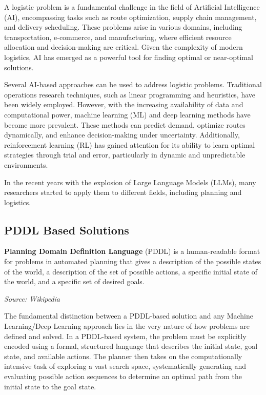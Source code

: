 A logistic problem is a fundamental challenge in the field of Artificial
Intelligence (AI), encompassing tasks such as route optimization, supply chain
management, and delivery scheduling. These problems arise in various domains, including
transportation, e-commerce, and manufacturing, where efficient resource
allocation and decision-making are critical. Given the complexity of modern logistics,
AI has emerged as a powerful tool for finding optimal or near-optimal solutions.

Several AI-based approaches can be used to address logistic problems. Traditional
operations research techniques, such as linear programming and heuristics, have been
widely employed. However, with the increasing availability of data and computational
power, machine learning (ML) and deep learning methods have become more
prevalent. These methods can predict demand, optimize routes dynamically, and enhance
decision-making under uncertainty. Additionally, reinforcement learning (RL) has
gained attention for its ability to learn optimal strategies through trial and error,
particularly in dynamic and unpredictable environments.

In the recent years with the explosion of Large Language Models (LLMs), many researchers
started to apply them to different fields, including planning and logistics.


\subsection{PDDL Based Solutions}
\begin{blockquote}
  \textbf{Planning Domain Definition Language} (PDDL) is a human-readable format
  for problems in automated planning that gives a description of the possible
  states of the world, a description of the set of possible actions, a specific
  initial state of the world, and a specific set of desired goals.

  \emph{Source: Wikipedia \cite{wiki-pddl}}
\end{blockquote}

The fundamental distinction between a PDDL-based solution and any Machine
Learning/Deep Learning approach lies in the very nature of how problems are
defined and solved. In a PDDL-based system, the problem must be explicitly
encoded using a formal, structured language that describes the initial state,
goal state, and available actions. The planner then takes on the computationally
intensive task of exploring a vast search space, systematically generating and evaluating
possible action sequences to determine an optimal path from the initial state to
the goal state.

